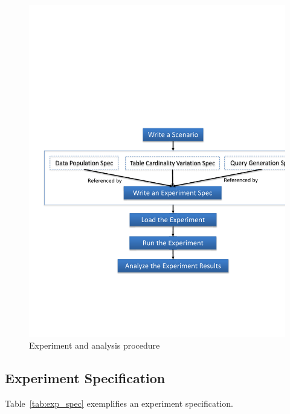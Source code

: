 \documentclass[conference]{IEEEtran}
\begin{document}
\begin{figure}[htp!]
\centering
\includegraphics[scale=0.4]{./figures/exp_proc}
\caption{Experiment and analysis procedure~\label{fig:exp_proc}}
\end{figure}

\subsection{Experiment Specification}
Table~\ref{tab:exp_spec} exemplifies an experiment specification. 
\end{document}
